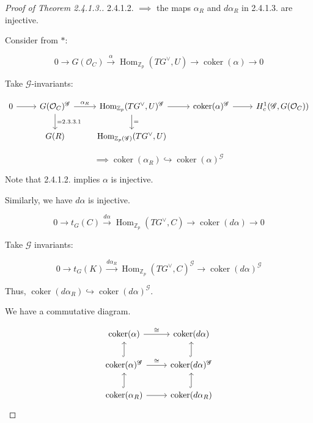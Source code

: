 \documentclass{article}
\theoremstyle{definition}
\numberwithin{theorem}{subsection}
\begin{document}
    \begin{proof}
        [Proof of Theorem 2.4.1.3.] 2.4.1.2. \(\implies\) the maps \(\alpha_R\) and \(d \alpha_R\) in 2.4.1.3. are injective.

        Consider from \(\ast\):

        \[
            0 \to G(\mathcal{O}_C) \xrightarrow{\alpha} \operatorname{Hom}_{\mathbb{Z}_p}(TG^\vee, U) \to \operatorname{coker}(\alpha) \to 0
        \]

        Take \(\mathscr{G}\)-invariants:

        \[
            \begin{tikzcd}
                0 \ar[r] & G(\mathcal{O}_C)^{\mathscr{G}} \ar[d,"= 2.3.3.1"] \ar[r,"\alpha_R"] & \operatorname{Hom}_{\mathbb{Z}_p}(TG^\vee, U)^{\mathscr{G}} \ar[d,"="] \ar[r] & \operatorname{coker}(\alpha)^{\mathscr{G}} \ar[r] & H_c^1(\mathscr{G}, G(\mathcal{O}_C)) \\ & G(R) & \operatorname{Hom}_{\mathbb{Z}_p(\mathscr{G})}(TG^\vee, U)
            \end{tikzcd}
        \]

        \[
            \implies \operatorname{coker}(\alpha_R) \hookrightarrow \operatorname{coker} (\alpha)^{\mathscr{G}}
        \]

        Note that 2.4.1.2. implies \(\alpha\) is injective.

        Similarly, we have \(d \alpha\) is injective.

        \[
            0 \to t_G(C) \xrightarrow{d \alpha} \operatorname{Hom}_{\mathbb{Z}_p}(TG^\vee, C) \to \operatorname{coker} (d \alpha) \to 0
        \]

        Take \(\mathscr{G}\) invariants:

        \[
            0 \to t_G(K) \xrightarrow{d \alpha_R} \operatorname{Hom}_{\mathbb{Z}_p}(TG^\vee, C)^{\mathscr{G}} \to \operatorname{coker} (d \alpha)^{\mathscr{G}}
        \]

        Thus, \(\operatorname{coker} (d \alpha_R) \hookrightarrow \operatorname{coker}(d \alpha)^{\mathscr{G}}\).

        We have a commutative diagram.

        \[
            \begin{tikzcd}
                \operatorname{coker}(\alpha) \ar[r,"\cong"] & \operatorname{coker} (d \alpha) \\
                \operatorname{coker} (\alpha)^{\mathscr{G}} \ar[u, hook] \ar[r,"\cong"] & \operatorname{coker}(d \alpha)^{\mathscr{G}} \ar[u, hook] \\ \operatorname{coker} (\alpha_R) \ar[u, hook] \ar[r] & \operatorname{coker}(d \alpha_R) \ar[u, hook] 
            \end{tikzcd}
        \]


\end{proof}
\end{document}
